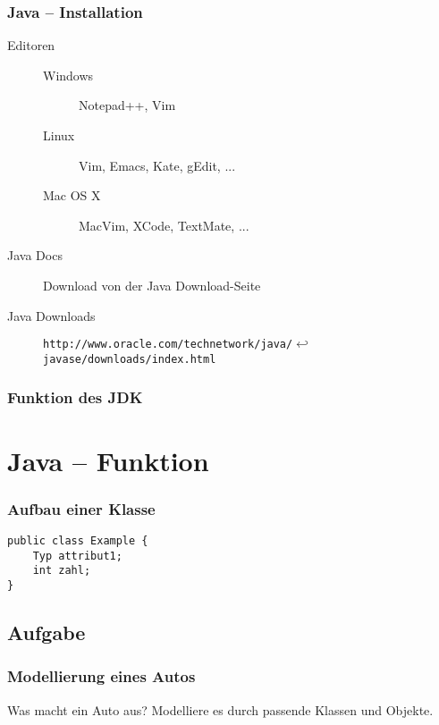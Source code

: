 \documentclass{beamer}
\begin{document}
\begin{frame}[fragile]
\frametitle{Java -- Installation}
\begin{description}
\item[Editoren]
\begin{description}
\item[Windows] Notepad++, Vim
\item[Linux] Vim, Emacs, Kate, gEdit, ...
\item[Mac OS X] MacVim, XCode, TextMate, ...
\end{description}
\item[Java Docs] Download von der Java Download-Seite
\item[Java Downloads] \verb|http://www.oracle.com/technetwork/java/|$\hookleftarrow$\\
\verb|javase/downloads/index.html|
\end{description}
\end{frame}

\begin{frame}
\frametitle{Funktion des JDK}
\end{frame}

\section{Java -- Funktion}
\begin{frame}[fragile]
\frametitle{Aufbau einer Klasse}
\begin{verbatim}
public class Example {
    Typ attribut1;
    int zahl;
}
\end{verbatim}
\end{frame}

\subsection{Aufgabe}
\begin{frame}
\frametitle{Modellierung eines Autos}
Was macht ein Auto aus? Modelliere es durch passende Klassen und Objekte.
\end{frame}
\end{document}
